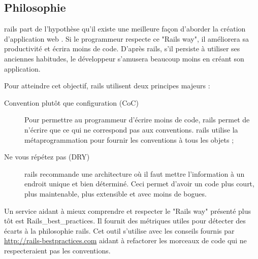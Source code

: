 \subsection{Philosophie}
\gls{rails} part de l'hypothèse qu'il existe une meilleure façon d'aborder la création d'application web \cite{rails-guides}. Si le programmeur respecte ce "Rails way", il améliorera sa productivité et écrira moins de code. D'après \gls{rails}, s’il persiste à utiliser ses anciennes habitudes, le développeur s'amusera beaucoup moins en créant son application.

Pour atteindre cet objectif, \gls{rails} utilisent deux principes majeurs :
\begin{description}
  \item[Convention plutôt que configuration (CoC) \cite{wiki-coc}] Pour permettre au programmeur d'écrire moins de code, \gls{rails} permet de n'écrire que ce qui ne correspond pas aux conventions. \gls{rails} utilise la métaprogrammation pour fournir les conventions à tous les objets ;
  \item[Ne vous répétez  pas (DRY) \cite{wiki-dry}] \gls{rails} recommande une architecture où il faut mettre l'information à un endroit unique et bien déterminé. Ceci permet d'avoir un code plus court, plus maintenable, plus extensible et avec moins de bogues.
\end{description}

\label{rbp}
Un service aidant à mieux comprendre et respecter le "Rails way" présenté plus tôt est Rails\_best\_practices. Il fournit des métriques utiles pour détecter des écarts à la philosophie \gls{rails}. Cet outil s'utilise avec les conseils fournis par \url{http://rails-bestpractices.com} aidant à refactorer les morceaux de code qui ne respecteraient pas les conventions.

